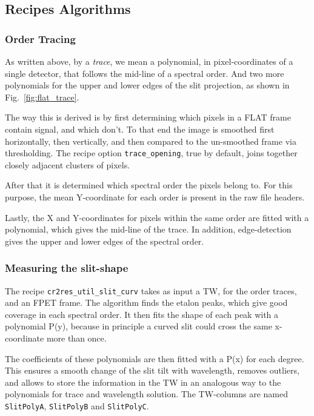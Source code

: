 \subsection{Recipes Algorithms} 
\label{sec:algorithms-recipes}

\subsubsection{Order Tracing}
\label{sec:ordertrace}

As written above, by a \emph{trace}, we mean a polynomial, in pixel-coordinates
of a single detector, that follows the mid-line of a spectral order. And two
more polynomials for the upper and lower edges of the slit projection, as shown
in Fig.~\ref{fig:flat_trace}.

The way this is derived is by first determining which pixels in a FLAT frame
contain signal, and which don't. To that end the image is smoothed first
horizontally, then vertically, and then compared to the un-smoothed frame via
thresholding. The recipe option \verb!trace_opening!, true by default, joins
together closely adjacent clusters of pixels.

After that it is determined which spectral order the pixels belong to. For this
purpose, the mean Y-coordinate for each order is present in the raw file
headers.

Lastly, the X and Y-coordinates for pixels within the same order are fitted with
a polynomial, which gives the mid-line of the trace. In addition, edge-detection
gives the upper and lower edges of the spectral order.

\subsubsection{Measuring the slit-shape}
\label{sec:tilt}

The recipe \verb!cr2res_util_slit_curv! takes as input a TW, for the order
traces, and an FPET frame. The algorithm finds the etalon peaks, which give good
coverage in each spectral order. It then fits the shape of each peak with a
polynomial P(y), because in principle a curved slit could cross the same
x-coordinate more than once.

The coefficients of these polynomials are then fitted with a P(x) for each
degree. This ensures a smooth change of the slit tilt with wavelength, removes
outliers, and allows to store the information in the TW in an analogous way to
the polynomials for trace and wavelength solution. The TW-columns are named
\verb!SlitPolyA!, \verb!SlitPolyB! and \verb!SlitPolyC!.

